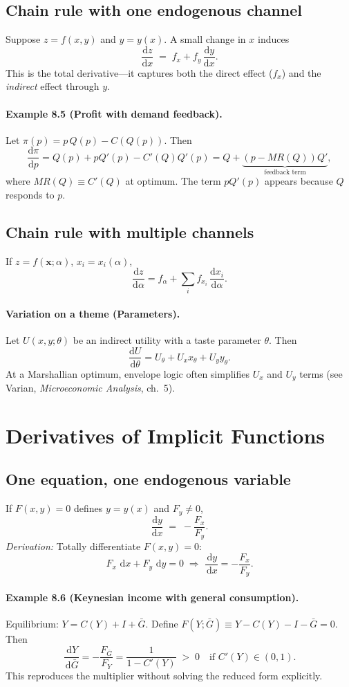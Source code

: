 \documentclass[11pt]{article}
\newcommand{\dd}{\,\mathrm{d}}
\newcommand{\dtotal}[2]{\frac{\mathrm{d} #1}{\mathrm{d} #2}}
\newcommand{\dytotal}[1]{\frac{\mathrm{d} y}{\mathrm{d} #1}}
\newcommand{\vect}[1]{\bm{#1}}
\newcommand{\paren}[1]{\left(#1\right)}
\begin{document}
\subsection*{Chain rule with one endogenous channel}
Suppose $z=f(x,y)$ and $y=y(x)$. A small change in $x$ induces
\[
\dtotal{z}{x} \;=\; f_x + f_y\,\dtotal{y}{x}.
\]
This is the total derivative---it captures both the direct effect ($f_x$) and the \emph{indirect} effect through $y$.

\paragraph{Example 8.5 (Profit with demand feedback).}
Let $\pi(p)=p\,Q(p)-C\!\paren{Q(p)}$. Then
\[
\dtotal{\pi}{p} 
= Q(p) + p Q'(p) - C'(Q)Q'(p)
= Q + \underbrace{\paren{p - MR(Q)}Q'}_{\text{feedback term}},
\]
where $MR(Q)\equiv C'(Q)$ at optimum. The term $p Q'(p)$ appears because $Q$ responds to $p$.

\subsection*{Chain rule with multiple channels}
If $z=f(\vect{x};\alpha)$, $x_i=x_i(\alpha)$,
\[
\dtotal{z}{\alpha}
= f_\alpha + \sum_{i} f_{x_i}\,\dtotal{x_i}{\alpha}.
\]

\paragraph{Variation on a theme (Parameters).}
Let $U(x,y;\theta)$ be an indirect utility with a taste parameter $\theta$. Then
\[
\dtotal{U}{\theta} = U_\theta + U_x x_\theta + U_y y_\theta.
\]
At a Marshallian optimum, envelope logic often simplifies $U_x$ and $U_y$ terms (see Varian, \emph{Microeconomic Analysis}, ch.~5).

\section{Derivatives of Implicit Functions}
\subsection*{One equation, one endogenous variable}
If $F(x,y)=0$ defines $y=y(x)$ and $F_y\neq 0$,
\[
\dytotal{x} \;=\; -\frac{F_x}{F_y}.
\]
\emph{Derivation:} Totally differentiate $F(x,y)=0$:
\[
F_x\,\dd x + F_y\,\dd y = 0 \;\Rightarrow\; \frac{\dd y}{\dd x} = -\frac{F_x}{F_y}.
\]

\paragraph{Example 8.6 (Keynesian income with general consumption).}
Equilibrium: $Y=C(Y)+I+\bar{G}$. Define $F(Y;\bar{G})\equiv Y-C(Y)-I-\bar{G}=0$.
Then
\[
\frac{\dd Y}{\dd \bar{G}}
= -\frac{F_{\bar{G}}}{F_Y}
= \frac{1}{1-C'(Y)}
\;>\;0
\quad \text{if } C'(Y)\in(0,1).
\]
This reproduces the multiplier without solving the reduced form explicitly.
\end{document}
